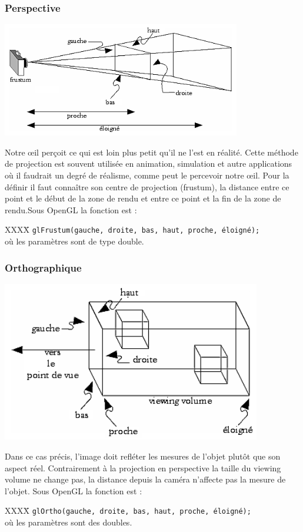 \subsubsection{Perspective}
\begin{center}
	 \includegraphics[height=5cm]{img/Perspective}
 \end{center}
Notre œil perçoit ce qui est loin plus petit qu’il ne l’est en réalité. Cette méthode de projection est souvent utilisée en animation, simulation et autre applications où il faudrait un degré de réalisme, comme peut le percevoir notre œil. Pour la définir il faut connaître son centre de projection (frustum), la distance entre ce point et le début de la zone de rendu et entre ce point et la fin de la zone de rendu.Sous OpenGL la fonction est : 
\begin{tabbing}
XXXX\= \kill
\> \verb|glFrustum(gauche, droite, bas, haut, proche, éloigné);| \\où les paramètres sont de type double.
\end{tabbing}


\subsubsection{Orthographique}
\begin{center}
	 \includegraphics[height=7cm]{img/Ortho}
 \end{center}
Dans ce cas précis, l’image doit refléter les mesures de l’objet plutôt que son aspect réel. Contrairement à la projection en perspective la taille du viewing volume ne change pas, la distance depuis la caméra n’affecte pas la mesure de l’objet. Sous OpenGL la fonction est : 
\begin{tabbing}
XXXX\= \kill
\> \verb|glOrtho(gauche, droite, bas, haut, proche, éloigné);| \\où les paramètres sont des doubles.
\end{tabbing}




\newpage